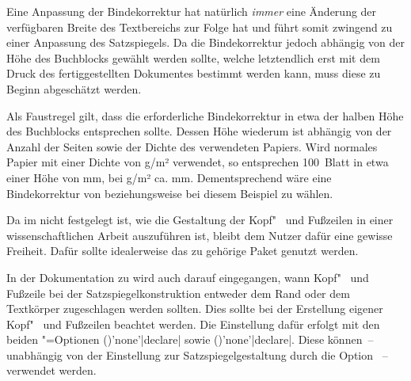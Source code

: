 \begin{Declaration*}{}
\begin{Declaration*}{}
\begin{Declaration*}{}
Eine Anpassung der Bindekorrektur hat natürlich \emph{immer} eine Änderung der 
verfügbaren Breite des Textbereichs zur Folge hat und führt somit zwingend zu 
einer Anpassung des Satzspiegels. Da die Bindekorrektur jedoch abhängig von der 
Höhe des Buchblocks gewählt werden sollte, welche letztendlich erst mit dem 
Druck des fertiggestellten Dokumentes bestimmt werden kann, muss diese zu 
Beginn abgeschätzt werden.
%
\begin{Example}
Als Faustregel gilt, dass die erforderliche Bindekorrektur in etwa der halben 
Höhe des Buchblocks entsprechen sollte. Dessen Höhe wiederum ist abhängig von 
der Anzahl der Seiten sowie der Dichte des verwendeten Papiers. Wird normales 
Papier mit einer Dichte von \unit[80]{g/m²} verwendet, so entsprechen 100~Blatt 
in etwa einer Höhe von \unit[10]{mm}, bei \unit[100]{g/m²} ca. \unit[12]{mm}. 
Dementsprechend wäre eine Bindekorrektur von  beziehungsweise 
 bei diesem Beispiel zu wählen.
%
\end{Example}

%
%
%
Da im \CD nicht festgelegt ist, wie die Gestaltung der Kopf"~ und Fußzeilen in 
einer wissenschaftlichen Arbeit auszuführen ist, bleibt dem Nutzer dafür eine 
gewisse Freiheit. Dafür sollte idealerweise das zu \KOMAScript{} gehörige Paket 
 genutzt werden. 

In der Dokumentation zu  wird auch darauf eingegangen, wann 
Kopf"~ und Fußzeile bei der Satzspiegelkonstruktion entweder dem Rand oder dem 
Textkörper zugeschlagen werden sollten. Dies sollte bei der Erstellung eigener 
Kopf"~ und Fußzeilen beachtet werden. Die Einstellung dafür erfolgt mit den 
beiden \KOMAScript"=Optionen 
()'none'|declare| sowie 
()'none'|declare|.
Diese können~-- unabhängig von der Einstellung zur Satzspiegelgestaltung durch 
die Option ~-- verwendet werden.



\end{Declaration*}
\end{Declaration*}
\end{Declaration*}

